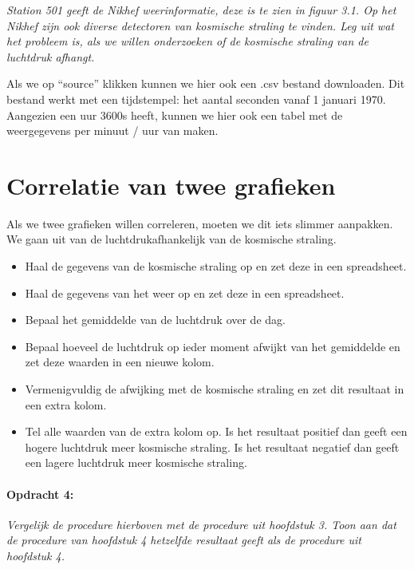 \emph{Station 501 geeft de Nikhef weerinformatie, deze is te zien in
figuur 3.1. Op het Nikhef zijn ook diverse detectoren van kosmische
straling te vinden. Leg uit wat het probleem is, als we willen onderzoeken
of de kosmische straling van de luchtdruk afhangt.}

Als we op ``source'' klikken kunnen we hier ook een .csv bestand
downloaden. Dit bestand werkt met een tijdstempel: het aantal seconden
vanaf 1 januari 1970. Aangezien een uur 3600s heeft, kunnen we hier
ook een tabel met de weergegevens per minuut / uur van maken. 


\section{Correlatie van twee grafieken}

Als we twee grafieken willen correleren, moeten we dit iets slimmer
aanpakken. We gaan uit van de luchtdrukafhankelijk van de kosmische
straling.
\begin{itemize}
\item Haal de gegevens van de kosmische straling op en zet deze in een spreadsheet.
\item Haal de gegevens van het weer op en zet deze in een spreadsheet.
\item Bepaal het gemiddelde van de luchtdruk over de dag.
\item Bepaal hoeveel de luchtdruk op ieder moment afwijkt van het gemiddelde
en zet deze waarden in een nieuwe kolom.
\item Vermenigvuldig de afwijking met de kosmische straling en zet dit resultaat
in een extra kolom.
\item Tel alle waarden van de extra kolom op. Is het resultaat positief
dan geeft een hogere luchtdruk meer kosmische straling. Is het resultaat
negatief dan geeft een lagere luchtdruk meer kosmische straling.
\end{itemize}

\paragraph*{Opdracht 4:}

\emph{Vergelijk de procedure hierboven met de procedure uit hoofdstuk
3. Toon aan dat de procedure van hoofdstuk 4 hetzelfde resultaat geeft
als de procedure uit hoofdstuk 4.}


